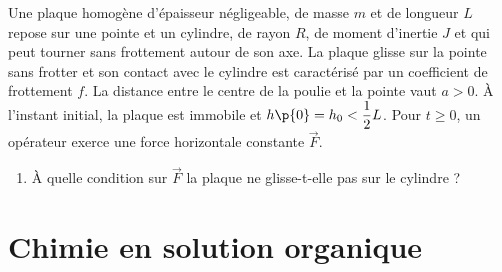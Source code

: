     \begin{minipage}{0.48\linewidth}
        Une plaque homogène d'épaisseur négligeable, de masse $m$ et de longueur $L$ repose sur une pointe et un cylindre, de rayon $R$, de moment d'inertie $J$ et qui peut tourner sans frottement autour de son axe. La plaque glisse sur la pointe sans frotter et son contact avec le cylindre est caractérisé par un coefficient de frottement $f$. La distance entre le centre de la poulie et la pointe vaut $a > 0$. À l'instant initial, la plaque est immobile et $h\p{0} = h_0 < \dfrac{1}{2}L$. Pour $t \geq 0$, un opérateur exerce une force horizontale constante $\vec{F}$. 
    \end{minipage}
    \hfill
    \begin{minipage}{0.5\linewidth}
        \centering
    \end{minipage}
    
    \begin{enumerate}
        \item À quelle condition sur $\vec{F}$ la plaque ne glisse-t-elle pas sur le cylindre ?
        
    \end{enumerate}
    
    
    \chapter{Chimie en solution organique}
    

